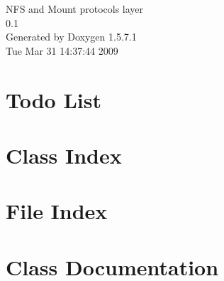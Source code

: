 \documentclass[a4paper]{book}
\begin{document}
\begin{titlepage}
\vspace*{7cm}
\begin{center}
{\Large NFS and Mount protocols layer \\[1ex]\large 0.1 }\\
\vspace*{1cm}
{\large Generated by Doxygen 1.5.7.1}\\
\vspace*{0.5cm}
{\small Tue Mar 31 14:37:44 2009}\\
\end{center}
\end{titlepage}
\clearemptydoublepage
{}
\tableofcontents
\clearemptydoublepage
{}
\chapter{Todo List}
\label{todo}

\chapter{Class Index}

\chapter{File Index}

\chapter{Class Documentation}


\end{document}
